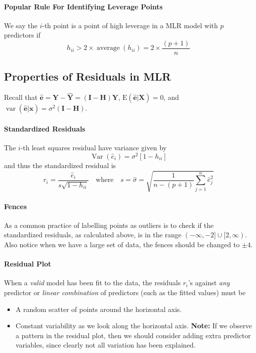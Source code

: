 \documentclass[10pt]{article}
\begin{document}
\paragraph{Popular Rule For Identifying Leverage Points} We say the $i$-th point is a point of high leverage in a MLR model with $p$ predictors if
\begin{equation*}
	h_{i i}>2 \times \operatorname{average}\left(h_{i i}\right)=2 \times \frac{(p+1)}{n}
\end{equation*}
\subsection{Properties of Residuals in MLR}
Recall that $\hat{\mathbf{e}} = \mathbf{Y} - \hat{\mathbf{Y}} = (\mathbf{I} - \mathbf{H})\mathbf{Y}$, $\mathrm{E}(\hat{\mathbf{e}} | \mathbf{X}) = 0$, and $\operatorname{var}(\hat{\mathbf{e}} | \mathbf{x}) = \sigma^{2}(\mathbf{I}-\mathbf{H})$.

\paragraph{Standardized Residuals} The $i$-th least squares residual have variance given by 
\begin{equation*}
	\operatorname{Var}\left(\hat{e}_{i}\right)=\sigma^{2}\left[1-h_{i i}\right]
\end{equation*}
	and thus the standardized residual is
\begin{equation*}
	r_{i}=\frac{\hat{e}_{i}}{s \sqrt{1-h_{i i}}} \quad \text{where} \quad s=\hat{\sigma}=\sqrt{\frac{1}{n-(p+1)} \sum_{j=1}^{n} \hat{e}_{j}^{2}}
\end{equation*}
\paragraph{Fences} As a common practice of labelling points as outliers is to check if the standardized residuals, as calculated above, is in the range $(-\infty, -2] \cup [2, \infty)$. Also notice when we have a large set of data, the fences should be changed to $\pm 4$. 

\paragraph{Residual Plot} When a \textit{valid} model has been fit to the data, the residuals $r_i$'s against \textit{any} predictor or \textit{linear combination} of predictors (such as the fitted values) must be
\begin{itemize}
    \item A random scatter of points around the horizontal axis.
    \item Constant variability as we look along the horizontal axis. \textbf{Note:} If we observe a pattern in the residual plot, then we should consider adding extra predictor variables, since clearly not all variation has been explained.
\end{itemize}
\end{document}
